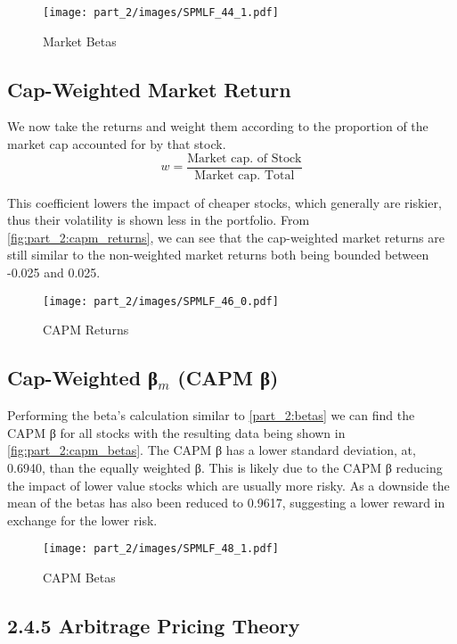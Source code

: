 \begin{figure}[!htb]
    \centering
    \texttt{[image: part\_2/images/SPMLF\_44\_1.pdf]}
    \caption{Market Betas}
    \label{fig:part_2:market_betas}
\end{figure}

\subsection{Cap-Weighted Market Return}

We now take the returns and weight them according to the proportion of the market cap accounted for by that stock.
\[ w = \frac{\text{Market cap. of Stock}}{\text{Market cap. Total}} \]

This coefficient lowers the impact of cheaper stocks, which generally are riskier, thus their volatility is shown less in the portfolio. From \autoref{fig:part_2:capm_returns}, we can see that the cap-weighted market returns are still similar to the non-weighted market returns both being bounded between -0.025 and 0.025.

\begin{figure}[!htb]
    \centering
    \texttt{[image: part\_2/images/SPMLF\_46\_0.pdf]}
    \caption{CAPM Returns}
    \label{fig:part_2:capm_returns}
\end{figure}

\subsection{Cap-Weighted β$_m$ (CAPM β)}

Performing the beta's calculation similar to \autoref{part_2:betas} we can find the CAPM β for all stocks with the resulting data being shown in \autoref{fig:part_2:capm_betas}. The CAPM β has a lower standard deviation, at, 0.6940, than the equally weighted β. This is likely due to the CAPM β reducing the impact of lower value stocks which are usually more risky. As a downside the mean of the betas has also been reduced to 0.9617, suggesting a lower reward in exchange for the lower risk.

\begin{figure}[!htb]
    \centering
    \texttt{[image: part\_2/images/SPMLF\_48\_1.pdf]}
    \caption{CAPM Betas}
    \label{fig:part_2:capm_betas}
\end{figure}

\subsection{2.4.5 Arbitrage Pricing Theory}

